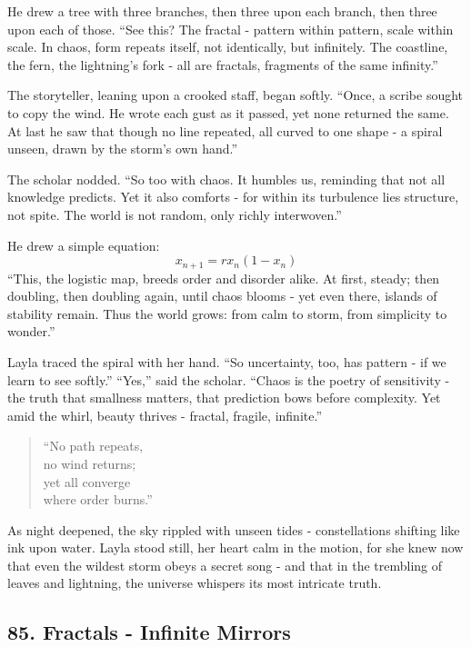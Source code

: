 \documentclass[
  letterpaper,
  DIV=11,
  numbers=noendperiod]{scrreprt}
\begin{document}
He drew a tree with three branches, then three upon each branch, then
three upon each of those. ``See this? The fractal - pattern within
pattern, scale within scale. In chaos, form repeats itself, not
identically, but infinitely. The coastline, the fern, the lightning's
fork - all are fractals, fragments of the same infinity.''

The storyteller, leaning upon a crooked staff, began softly. ``Once, a
scribe sought to copy the wind. He wrote each gust as it passed, yet
none returned the same. At last he saw that though no line repeated, all
curved to one shape - a spiral unseen, drawn by the storm's own hand.''

The scholar nodded. ``So too with chaos. It humbles us, reminding that
not all knowledge predicts. Yet it also comforts - for within its
turbulence lies structure, not spite. The world is not random, only
richly interwoven.''

He drew a simple equation: \[
x_{n+1} = r x_n (1 - x_n)
\] ``This, the logistic map, breeds order and disorder alike. At first,
steady; then doubling, then doubling again, until chaos blooms - yet
even there, islands of stability remain. Thus the world grows: from calm
to storm, from simplicity to wonder.''

Layla traced the spiral with her hand. ``So uncertainty, too, has
pattern - if we learn to see softly.'' ``Yes,'' said the scholar.
``Chaos is the poetry of sensitivity - the truth that smallness matters,
that prediction bows before complexity. Yet amid the whirl, beauty
thrives - fractal, fragile, infinite.''

\begin{quote}
``No path repeats,\\
no wind returns;\\
yet all converge\\
where order burns.''
\end{quote}

As night deepened, the sky rippled with unseen tides - constellations
shifting like ink upon water. Layla stood still, her heart calm in the
motion, for she knew now that even the wildest storm obeys a secret song
- and that in the trembling of leaves and lightning, the universe
whispers its most intricate truth.

\subsection{85. Fractals - Infinite
Mirrors}\label{fractals---infinite-mirrors}
\end{document}
